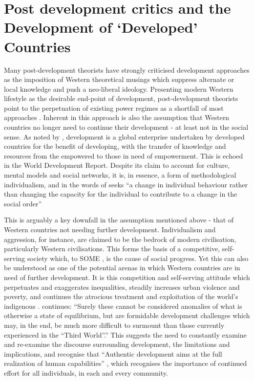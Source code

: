 \section{Post development critics and the Development of `Developed' Countries}
Many post-development theorists have strongly criticised development approaches as the imposition of Western theoretical musings which suppress alternate or local knowledge and push a neo-liberal ideology. Presenting modern Western lifestyle as the desirable end-point of development, post-development theorists point to the perpetuation of existing power regimes as a shortfall of most approaches \citep{Sahle2009}. Inherent in this approach is also the assumption that Western countries no longer need to continue their development - at least not in the social sense. As noted by \citet{Vakil2001}, development is a global enterprise undertaken by developed countries for the benefit of developing, with the transfer of knowledge and resources from the empowered to those in need of empowerment. This is echoed in the World Development Report. Despite its claim to account for culture, mental models and social networks, it is, in essence, a form of methodological individualism, and in the words of \citet[][p33-34]{Biccum2016} seeks “a change in individual behaviour rather than changing the capacity for the individual to contribute to a change in the social order” 

This is arguably a key downfall in the assumption mentioned above - that of Western countries not needing further development. Individualism and aggression, for instance, are claimed to be the bedrock of modern civilisation, particularly Western civilisations. This forms the basis of a competitive, self-serving society which, to SOME %
, is the cause of social progress. Yet this can also be understood as one of the potential arenas in which Western countries are in need of further development. It is this competition and self-serving attitude which perpetuates and exaggerates inequalities, steadily increases urban violence and poverty, and continues the atrocious treatment and exploitation of the world's indigenous \citep{Vakil1987}. \citet{Vakil1987} continues: “Surely these cannot be considered anomalies of what is otherwise a state of equilibrium, but are formidable development challenges which may, in the end, be much more difficult to surmount than those currently experienced in the “Third World”.” This suggests the need to constantly examine and re-examine the discourse surrounding development, the limitations and implications, and recognise that “Authentic development aims at the full realization of human capabilities” \citep[][p482, quoting his 1971 article]{Goulet1980}, which recognises the importance of continued effort for all individuals, in each and every community.



